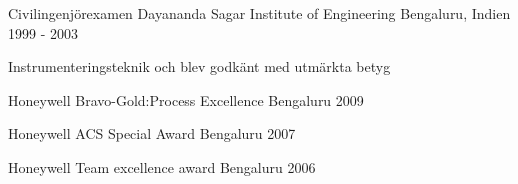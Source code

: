 \documentclass[12pt, a4paper]{awesome-cv}
\begin{document}
    \begin{cventries}
    \cventry
        {Civilingenjörexamen}
        {Dayananda Sagar Institute of Engineering}
        {Bengaluru, Indien}
        {1999 - 2003}
        {
            \begin{cvitems}
            \item {Instrumenteringsteknik och blev godkänt med utmärkta betyg}
            \end{cvitems}
        }
  \end{cventries}

  \begin{cvhonors}

      \cvhonor
      {Honeywell}
      {Bravo-Gold:Process Excellence}
      {Bengaluru}
      {2009}

      \cvhonor
      {Honeywell}
      {ACS Special Award}
      {Bengaluru}
      {2007}

      \cvhonor
      {Honeywell}
      {Team excellence award}
      {Bengaluru}
      {2006}
  \end{cvhonors}
\end{document}
